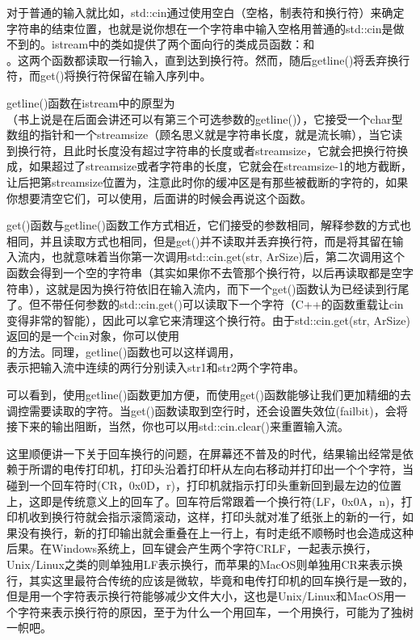 对于普通的输入就比如，std::cin通过使用空白（空格，制表符和换行符）来确定字符串的结束位置，也就是说你想在一个字符串中输入空格用普通的std::cin是做不到的。istream中的类如提供了两个面向行的类成员函数：和\\ 。这两个函数都读取一行输入，直到达到换行符。然而，随后getline()将丢弃换行符，而get()将换行符保留在输入序列中。

getline()函数在istream中的原型为\\ （书上说是在后面会讲还可以有第三个可选参数的getline()），它接受一个char型数组的指针和一个streamsize（顾名思义就是字符串长度，就是流长嘛），当它读到换行符，且此时长度没有超过字符串的长度或者streamsize，它就会把换行符换成\leftqm{}\rightqm，如果超过了streamsize或者字符串的长度，它就会在streamsize-1的地方截断，让后把第streamsize位置为\leftqm{}\rightqm，注意此时你的缓冲区是有那些被截断的字符的，如果你想要清空它们，可以使用，后面讲的时候会再说这个函数。

get()函数与getline()函数工作方式相近，它们接受的参数相同，解释参数的方式也相同，并且读取方式也相同，但是get()并不读取并丢弃换行符，而是将其留在输入流内，也就意味着当你第一次调用std::cin.get(str, ArSize)后，第二次调用这个函数会得到一个空的字符串（其实如果你不去管那个换行符，以后再读取都是空字符串），这就是因为换行符依旧在输入流内，而下一个get()函数认为已经读到行尾了。但不带任何参数的std::cin.get()可以读取下一个字符（C++的函数重载让cin变得非常的智能），因此可以拿它来清理这个换行符。由于std::cin.get(str, ArSize)返回的是一个cin对象，你可以使用\\ 的方法。同理，getline()函数也可以这样调用，\\ 表示把输入流中连续的两行分别读入str1和str2两个字符串。

可以看到，使用getline()函数更加方便，而使用get()函数能够让我们更加精细的去调控需要读取的字符。当get()函数读取到空行时，还会设置失效位(failbit)，会将接下来的输出阻断，当然，你也可以用std::cin.clear()来重置输入流。\dpar

这里顺便讲一下关于回车换行的问题，在屏幕还不普及的时代，结果输出经常是依赖于所谓的电传打印机，打印头沿着打印杆从左向右移动并打印出一个个字符，当碰到一个回车符时(CR，0x0D，\mybackslash r)，打印机就指示打印头重新回到最左边的位置上，这即是传统意义上的回车了。回车符后常跟着一个换行符(LF，0x0A，\mybackslash n)，打印机收到换行符就会指示滚筒滚动，这样，打印头就对准了纸张上的新的一行，如果没有换行，新的打印输出就会重叠在上一行上，有时走纸不顺畅时也会造成这种后果。在Windows系统上，回车键会产生两个字符CRLF，一起表示换行，Unix/Linux之类的则单独用LF表示换行，而苹果的MacOS则单独用CR来表示换行，其实这里最符合传统的应该是微软，毕竟和电传打印机的回车换行是一致的，但是用一个字符表示换行符能够减少文件大小，这也是Unix/Linux和MacOS用一个字符来表示换行符的原因，至于为什么一个用回车，一个用换行，可能为了独树一帜吧。

